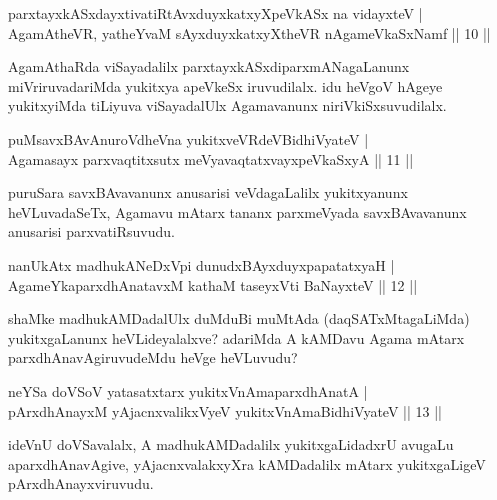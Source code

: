 \begin{shl}
parxtayxkASxdayxtivatiRtAvxduyxkatxyXpeVkASx na vidayxteV |\\
AgamAtheVR, yatheYvaM sAyxduyxkatxyXtheVR nA\s \s gameVkaSxNamf \hfill || 10 || 
\end{shl}

\begin{artha}
AgamAthaRda viSayadalilx parxtayxkASxdiparxmANagaLanunx miVriruvadariMda yukitxya apeVkeSx iruvudilalx. idu heVgoV hAgeye yukitxyiMda tiLiyuva viSayadalUlx Agamavanunx niriVkiSxsuvudilalx.
\end{artha}


\begin{shl}
puMsavxBAvAnuroVdheVna yukitxveVRdeV\s BidhiVyateV |\\
Agamasayx parxvaqtitxsutx meVyavaqtatxvayxpeVkaSxyA \hfill || 11 ||
\end{shl}

\begin{artha}
puruSara savxBAvavanunx anusarisi veVdagaLalilx yukitxyanunx heVLuvadaSeTx, Agamavu mAtarx tananx parxmeVyada savxBAvavanunx anusarisi parxvatiRsuvudu.
\end{artha}


\begin{shl}
nanUkAtx madhukANeDxV\s pi dunudxBAyxduyxpapatatxyaH |\\
AgameYkaparxdhAnatavxM kathaM taseyxVti BaNayxteV \hfill || 12 || 
\end{shl}

\begin{artha}
shaMke \mdash  madhukAMDadalUlx duMduBi muMtAda (daqSATxMtagaLiMda) yukitxgaLanunx heVLideyalalxve? adariMda A kAMDavu Agama mAtarx parxdhAnavAgiruvudeMdu heVge heVLuvudu?
\end{artha}


\begin{shl}
neYSa doVSoV yatasatxtarx yukitxVnAmaparxdhAnatA |\\
pArxdhAnayxM yAjacnxvalikxVyeV yukitxVnAmaBidhiVyateV \hfill || 13 || 
\end{shl}

\begin{artha}
ideVnU doVSavalalx, A madhukAMDadalilx yukitxgaLidadxrU avugaLu aparxdhAnavAgive, yAjacnxvalakxyXra kAMDadalilx mAtarx yukitxgaLigeV pArxdhAnayxviruvudu.
\end{artha}


